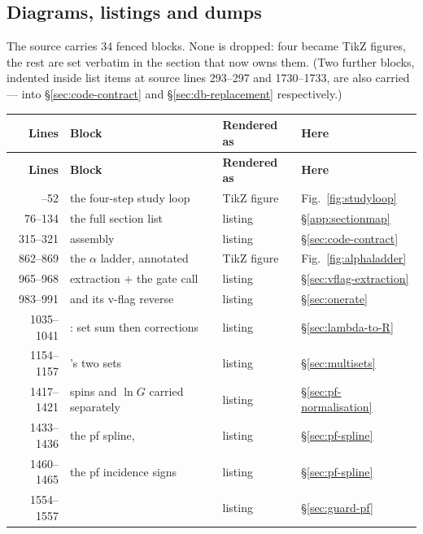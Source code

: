 \subsection{Diagrams, listings and dumps}
\label{app:diagrams}

The source carries 34 fenced blocks. None is dropped: four became TikZ figures,
the rest are set verbatim in the section that now owns them. (Two further
blocks, indented inside list items at source lines 293--297 and 1730--1733, are
also carried --- into \S\ref{sec:code-contract} and \S\ref{sec:db-replacement}
respectively.)

\begingroup
\small
\begin{longtable}{@{}r L{6.4cm} L{2.4cm} L{3.4cm}@{}}
\toprule
\textbf{Lines} & \textbf{Block} & \textbf{Rendered as} & \textbf{Here} \\
\midrule
\endfirsthead
\toprule
\textbf{Lines} & \textbf{Block} & \textbf{Rendered as} & \textbf{Here} \\
\midrule
\endhead
\bottomrule
{}--52 & the four-step study loop & TikZ figure & Fig.~\ref{fig:studyloop} \\
76--134 & the full section list & listing & \S\ref{app:sectionmap} \\
315--321 &  assembly & listing &
  \S\ref{sec:code-contract} \\
862--869 & the $\alpha$ ladder, annotated & TikZ figure &
  Fig.~\ref{fig:alphaladder} \\
965--968 &  extraction $+$ the gate call & listing &
  \S\ref{sec:vflag-extraction} \\
983--991 &  and its v-flag reverse & listing &
  \S\ref{sec:onerate} \\
1035--1041 & : set sum then corrections & listing &
  \S\ref{sec:lambda-to-R} \\
1154--1157 & 's two sets & listing &
  \S\ref{sec:multisets} \\
1417--1421 & spins and $\ln G$ carried separately & listing &
  \S\ref{sec:pf-normalisation} \\
1433--1436 & the pf spline,  & listing &
  \S\ref{sec:pf-spline} \\
1460--1465 & the pf incidence signs & listing & \S\ref{sec:pf-spline} \\
1554--1557 &  & listing & \S\ref{sec:guard-pf} \\

\end{longtable}
